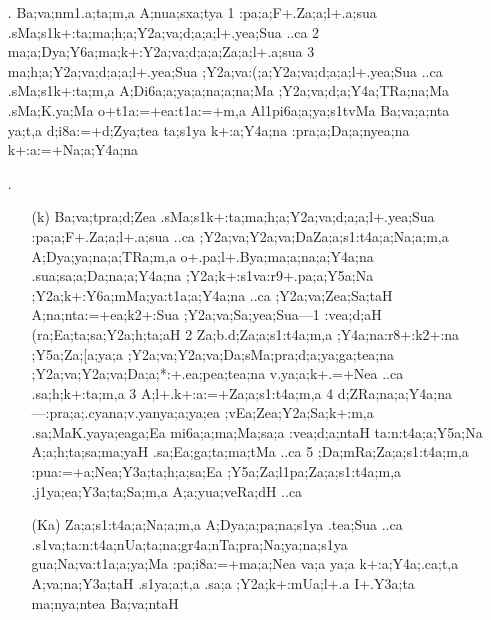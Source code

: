 \begin{spacing}{1.15}
\begin{itemize}
 \item[{\sktf 16}.] {\sktf Ba;va;nm1.a;ta;m,a A;nua;sxa;tya\ZF{,}
\ZF{(}1\ZF{)} :pa;a;F+.Za;a;l+.a;sua .sMa;s1k+:ta;ma;h;a;Y2a;va;d;a;a;l+.yea;Sua ..ca\ZF{,}
\ZF{(}2\ZF{)} ma;a;Dya;Y6a;ma;k+:Y2a;va;d;a;a;Za;a;l+.a;sua\ZF{,}
\ZF{(}3\ZF{)} ma;h;a;Y2a;va;d;a;a;l+.yea;Sua
;Y2a;va:(;a;Y2a;va;d;a;a;l+.yea;Sua ..ca
.sMa;s1k+:ta;m,a A;Di6a;a;ya;a;na;a;na;Ma
;Y2a;va;d;a;Y4a;TRa;na;Ma .sMa;K.ya;Ma o+t1a:=+ea:t1a:=+m,a A{l1pi6a;a};ya;s1tvMa Ba;va;a;nta ya;t,a
d;i8a:=+d;Zya;tea\ZF{,} ta;s1ya k+:a;Y4a;na
:pra;a;Da;a;nyea;na k+:a:=+Na;a;Y4a;na}
 
 \item[{\sktf 17}.]
     \begin{itemize}
 \item[({\sktf k})]{\sktf Ba;va;tpra;d;Zea
.sMa;s1k+:ta;ma;h;a;Y2a;va;d;a;a;l+.yea;Sua
:pa;a;F+.Za;a;l+.a;sua ..ca ;Y2a;va;Y2a;va;Da\ZF{-}Za;a;s1:t4a;a;Na;a;m,a
A;Dya;ya;na;a;TRa;m,a o+.pa;l+.Bya;ma;a;na;a;Y4a;na .sua;sa;a;Da;na;a;Y4a;na
;Y2a;k+:s1va:r9+.pa;a;Y5a;Na ;Y2a;k+:Y6a;mMa;ya:t1a;a;Y4a;na
..ca\ZF{,} ;Y2a;va;Zea;Sa;taH A;na;nta:=+ea;k2+:Sua
;Y2a;va;Sa;yea;Sua}{\rm---}{\sktf \ZF{(}1\ZF{)} :vea;d;aH \ZF{(}(ra;Ea;ta;sa;Y2a;h;ta;aH\ZF{),}
\ZF{(}2\ZF{)} Za;b.d;Za;a;s1:t4a;m,a \ZF{(};Y4a;na:r8+:k2+:na\ZF{,}
;Y5a;Za;[a;ya;a\ZF{,} ;Y2a;va;Y2a;va;Da;sMa;pra;d;a;ya;ga;tea;na
;Y2a;va;Y2a;va;Da;a;*:+.ea;pea;tea;na v.ya;a;k+.=+Nea ..ca
.sa;h;k+:ta;m,a\ZF{),} \ZF{(}3\ZF{)}
A;l+.k+:a:=+Za;a;s1:t4a;m,a\ZF{,} \ZF{(}4\ZF{)}
d;ZRa;na;a;Y4a;na}{\rm---}{\sktf :pra;a;.cya\ZF{-}na;v.ya\ZF{-}nya;a;ya;ea%
\ZF{,} ;vEa;Zea;Y2a;Sa;k+:m,a\ZF{,} {.sa;Ma}{K.ya}{ya;ea}{ga;Ea}\ZF{,} mi6a;a;ma;Ma;sa;a\ZF{,} :vea;d;a;ntaH
ta:n:t4a;a;Y5a;Na\ZF{,} A;a;h;ta;sa;ma;yaH .sa;Ea;ga;ta;ma;tMa
..ca\ZF{,} \ZF{(}5\ZF{)} ;Da;mRa;Za;a;s1:t4a;m,a\ZF{,}
:pua:=+a;Nea;Y3a;ta;h;a;sa;Ea\ZF{,} ;Y5a;Za;l1pa;Za;a;s1:t4a;m,a\ZF{,}
.j1ya;ea;Y3a;ta;Sa;m,a\ZF{,} A;a;yua;veRa;dH ..ca} 
 
   \item[({\sktf Ka})] {\sktf Za;a;s1:t4a;a;Na;a;m,a A;Dya;a;pa;na;s1ya\ZF{,}
.tea;Sua ..ca .s1va;ta:n:t4a;nUa;ta;na;gr4a;nTa;pra;Na;ya;na;s1ya\ZF{,}
gua;Na;va:t1a;a;ya;Ma :pa;i8a:=+ma;a;Nea va;a ya;a k+:a;Y4a;.ca;t,a
A;va;na;Y3a;taH .s1ya;a;t,a\ZF{,} .sa;a ;Y2a;k+:mUa;l+.a
I+.Y3a;ta ma;nya;ntea Ba;va;ntaH }
 

\end{itemize}
\end{itemize}
\end{spacing}

